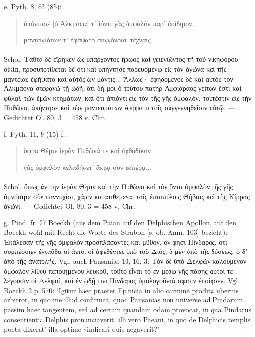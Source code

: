 \documentclass[a4paper, 11pt, oneside]{article}
\begin{document}
e. Pyth. 8, 62 (85):
\begin{quotation}
ὑπάντασέ [ὁ Ἀλκμάων] τ᾿ ἰόντι γᾶς ὀμφαλὸν παρ' ἀοίδιμον,

μαντευμάτων τ' ἐφάψατο συγγόνοισι τέχναις.
\end{quotation}
\paragraph{}
Schol. Ταῦτα δὲ εἴρηκεν ὡς ὑπάρχοντος ἥρωος καὶ γειενιῶντος τῇ τοῦ νικηφόρου οἰκίᾳ, προσυποτίθεται δὲ ὅτι καὶ ὑπήντησε πορευομένῳ εἰς τὸν ἀγῶνα καὶ τῆς μαντείας ἐφήψατο καὶ αὐτὸς ὢν μάντις... Ἄλλως· ἐφηδόμενος δὲ καὶ αὐτὸς τὸν Ἀλκμάονα στεφανῷ τῇ ὠδῇ, ὅτι δή μοι ὁ τούτου πατὴρ Ἀμφιάραος γείτων ἐστὶ καὶ φύλαξ τῶν ἐμῶν κτημάτων, καὶ ὅτι ἀπιόντι εἰς τὸν τῆς γῆς ὀμφαλόν, τουτέστιν εἰς τὴν Πυθῶνα, ἀκήντησε καὶ τῶν μαντευμάτων ἐφήψατο τοῖς συγγεννηθεῖσιν αὐτῷ. --- Gedichtet Ol. 80, 3 = 458 v. Chr.

f. Pyth. 11, 9 (15) f.:
\begin{quotation}
ὄφρα Θέμιν ἱερὰν Πυθῶνά τε καὶ ὀρθοδίκαν

γᾶς ὀμφαλὸν κελαδήσετ' ἄκρᾳ σὺν ἑσπέρᾳ...
\end{quotation}
\paragraph{}
Schol. ὅπως ἂν τὴν ἱερὰν Θέμιν καὶ τὴν Πυθῶνα καὶ τὸν ὄντα ὀμφαλὸν τῆς γῆς ὑμνήσητε σὺν παννυχίσι, χάριν κατατιθέμεναι ταῖς ἑπταπύλοις Θήβαις καὶ τῆς Κίρρας ἀγῶνι. --- Gedichtet Ol. 80, 3 = 458 v. Chr.

g. Pind. fr. 27 Boeckh (aus dem Paian auf den Delphischen Apollon, auf den Boeckh wohl mit Recht die Worte des Strabon [s. ob. Anm. 103] bezieht): Ἐκάλεσαν τῆς γῆς ὀμφαλὸν προσπλάσαντες καὶ μῦθον, ὅν φησι Πίνδαρος, ὅτι συμπέσοιεν ἐνταῦθα οἱ ἀετοὶ οἱ ἀφεθέντες ὑπὸ τοῦ Διός, ὁ μὲν ἀπὸ τῆς δύσεως, ὁ δ' ἀπὸ τῆς ἀνατολῆς. Vgl. auch Pausanias 10, 16, 3: Τὸν δὲ ὑπὸ Δελφῶν καλούμενον ὀμφαλὸν λίθου πεποιημένου λευκοῦ, τοῦτο εἶναι τὸ ἐν μέσῳ γῆς πάσης αὐτοί τε λέγουσιν οἱ Δελφοί, καὶ ἐν ᾠδῇ τινι Πίνδαρος ὁμολογοῦντά σφισιν ἐποίησεν. Vgl. Boeckh 2 p. 570: `Igitur haec praeter Epinicia in alio carmine prodita uberius arbitror, in quo me illud confirmat, quod Pausanias non universe ad Pindarum passim haec tangentem, sed ad certam quandam odam provocat, in qua Pindarus consentientia Delphis pronunciaverit: illi vero Paeani, in quo de Delphicis templis poeta dixerat' illa optime vindicari quis negaverit?'
\end{document}

